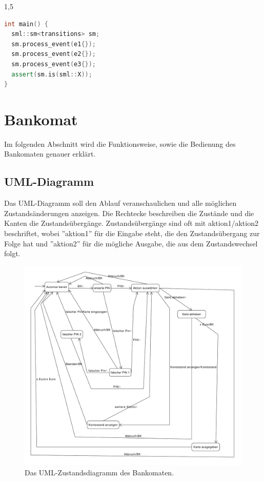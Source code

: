 \documentclass[a4paper]{article}
\begin{document}
\begin{spacing}{1,5}
\begin{lstlisting}[language=c++]
int main() {
  sml::sm<transitions> sm;
  sm.process_event(e1{});
  sm.process_event(e2{});
  sm.process_event(e3{});
  assert(sm.is(sml::X));
}
\end{lstlisting}

\newpage

\section{Bankomat}

Im folgenden Abschnitt wird die Funktionsweise, sowie die Bedienung des Bankomaten genauer erklärt. 

\subsection{UML-Diagramm}

Das UML-Diagramm soll den Ablauf veranschaulichen und alle möglichen Zustandsänderungen anzeigen. Die Rechtecke beschreiben die Zustände und die Kanten die Zustandsübergänge. Zustandsübergänge sind oft mit aktion1/aktion2 beschriftet, wobei ''aktion1'' für die Eingabe steht, die den Zustandsübergang zur Folge hat und ''aktion2'' für die mögliche Ausgabe, die aus dem Zustandswechsel folgt.


\begin{figure}[h!]
\begin{center}
\includegraphics[width=\linewidth]{bankomat_v2.pdf}
\caption{Das UML-Zustandsdiagramm des Bankomaten.}
\end{center}
\end{figure}
	

\end{spacing}
\end{document}
